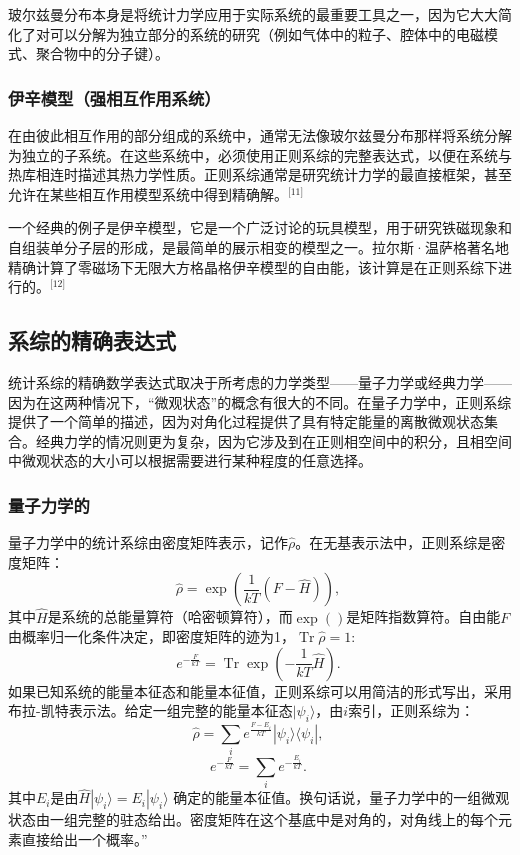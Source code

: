 玻尔兹曼分布本身是将统计力学应用于实际系统的最重要工具之一，因为它大大简化了对可以分解为独立部分的系统的研究（例如气体中的粒子、腔体中的电磁模式、聚合物中的分子键）。
\subsubsection{伊辛模型（强相互作用系统）}  
在由彼此相互作用的部分组成的系统中，通常无法像玻尔兹曼分布那样将系统分解为独立的子系统。在这些系统中，必须使用正则系综的完整表达式，以便在系统与热库相连时描述其热力学性质。正则系综通常是研究统计力学的最直接框架，甚至允许在某些相互作用模型系统中得到精确解。\(^\text{[11]}\)

一个经典的例子是伊辛模型，它是一个广泛讨论的玩具模型，用于研究铁磁现象和自组装单分子层的形成，是最简单的展示相变的模型之一。拉尔斯·温萨格著名地精确计算了零磁场下无限大方格晶格伊辛模型的自由能，该计算是在正则系综下进行的。\(^\text{[12]}\)
\subsection{系综的精确表达式}
统计系综的精确数学表达式取决于所考虑的力学类型——量子力学或经典力学——因为在这两种情况下，“微观状态”的概念有很大的不同。在量子力学中，正则系综提供了一个简单的描述，因为对角化过程提供了具有特定能量的离散微观状态集合。经典力学的情况则更为复杂，因为它涉及到在正则相空间中的积分，且相空间中微观状态的大小可以根据需要进行某种程度的任意选择。
\subsubsection{量子力学的}
量子力学中的统计系综由密度矩阵表示，记作\(\hat{\rho}\)。在无基表示法中，正则系综是密度矩阵：
\[
\hat{\rho} = \exp \left( \frac{1}{kT} (F - \hat{H}) \right),~
\]
其中\(\hat{H}\)是系统的总能量算符（哈密顿算符），而\(\exp()\)是矩阵指数算符。自由能\(F\)由概率归一化条件决定，即密度矩阵的迹为1，\(\operatorname{Tr} \hat{\rho} = 1:\)
\[
e^{- \frac{F}{kT}} = \operatorname{Tr} \exp \left( - \frac{1}{kT} \hat{H} \right).~
\]
如果已知系统的能量本征态和能量本征值，正则系综可以用简洁的形式写出，采用布拉-凯特表示法。给定一组完整的能量本征态\(|\psi_i\rangle\)，由\(i\)索引，正则系综为：
\[
\hat{\rho} = \sum_{i} e^{\frac{F - E_i}{kT}} |\psi_i \rangle \langle \psi_i |,~
\]
\[
e^{- \frac{F}{kT}} = \sum_{i} e^{- \frac{E_i}{kT}}.~
\]
其中\( E_i \)是由\(\hat{H} |\psi_i\rangle = E_i |\psi_i\rangle \) 确定的能量本征值。换句话说，量子力学中的一组微观状态由一组完整的驻态给出。密度矩阵在这个基底中是对角的，对角线上的每个元素直接给出一个概率。”